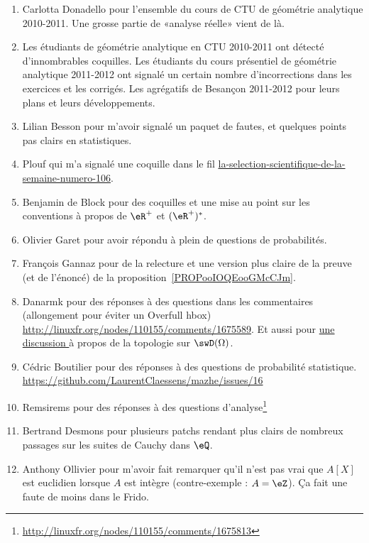 \begin{enumerate}
	\item
	      Carlotta Donadello pour l'ensemble du cours de CTU de géométrie analytique 2010-2011. Une grosse partie de «analyse réelle» vient de là.
	\item
	      Les étudiants de géométrie analytique en CTU 2010-2011 ont détecté d'innombrables coquilles. Les étudiants du cours présentiel de géométrie analytique 2011-2012 ont signalé un certain nombre d'incorrections dans les exercices et les corrigés. Les agrégatifs de Besançon 2011-2012 pour leurs plans et leurs développements.
	\item
	      Lilian Besson pour m'avoir signalé un paquet de fautes, et quelques points pas clairs en statistiques.
	\item
	      Plouf qui m'a signalé une coquille dans le fil \href{http://passeurdesciences.blog.lemonde.fr/2014/01/24/la-selection-scientifique-de-la-semaine-numero-106}{la-selection-scientifique-de-la-semaine-numero-106}.
	\item
	      Benjamin de Block pour des coquilles et une mise au point sur les conventions à propos de \( \eR^+\) et \( (\eR^+)^*\).
	\item
	      Olivier Garet pour avoir répondu à plein de questions de probabilités.
	\item
	      François Gannaz pour de la relecture et une version plus claire de la preuve (et de l'énoncé) de la proposition~\ref{PROPooIOQEooGMcCJm}.
	\item
	      Danarmk pour des réponses à des questions dans les commentaires (allongement pour éviter un Overfull hbox) \url{http://linuxfr.org/nodes/110155/comments/1675589}. Et aussi pour \href{ https://github.com/LaurentClaessens/mazhe/issues/87 }{ une discussion } à propos de la topologie sur \( \swD(\Omega)\).
	\item
	      Cédric Boutilier pour des réponses à des questions de probabilité statistique. \url{https://github.com/LaurentClaessens/mazhe/issues/16}
	\item
	      Remsirems pour des réponses à des questions d'analyse\footnote{\url{http://linuxfr.org/nodes/110155/comments/1675813}}
	\item
	      Bertrand Desmons pour plusieurs patchs rendant plus clairs de nombreux passages sur les suites de Cauchy dans \( \eQ\).
	\item
	      Anthony Ollivier pour m'avoir fait remarquer qu'il n'est pas vrai que \( A[X]\) est euclidien lorsque \( A\) est intègre (contre-exemple : \( A=\eZ\)). Ça fait une faute de moins dans le Frido.

\end{enumerate}
